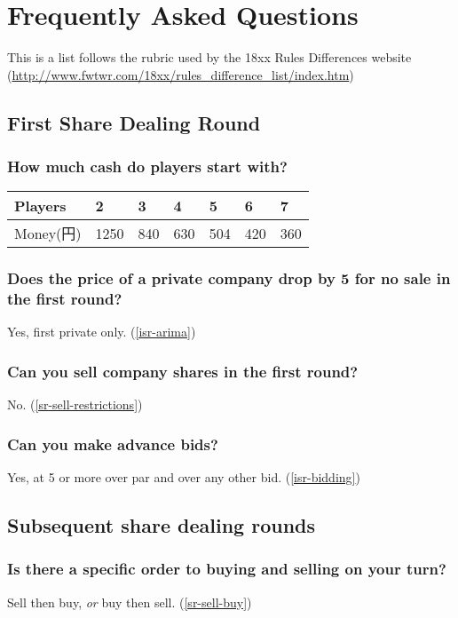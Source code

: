 \section{Frequently Asked Questions}
This is a list follows the rubric used by the 18xx Rules Differences
website
(\url{http://www.fwtwr.com/18xx/rules_difference_list/index.htm})

\renewcommand*{\thesubsection}{\arabic{subsection}}

\subsection{First Share Dealing Round}

\subsubsection{How much cash do players start with?}
\begin{tabular}{l|llllll}
Players & 2 & 3 & 4 & 5 & 6 & 7 \\ \hline
Money(円) & 1250 & 840 & 630 & 504 & 420 & 360
\end{tabular}

\subsubsection{Does the price of a private company drop by 5 for no
  sale in the first round?}
Yes, first private only. (\autoref{isr-arima})

\subsubsection{Can you sell company shares in the first round?}
No. (\autoref{sr-sell-restrictions})

\subsubsection{Can you make advance bids?}
Yes, at 5 or more over par and over any other bid. (\autoref{isr-bidding})

\subsection{Subsequent share dealing rounds}

\subsubsection{Is there a specific order to buying and selling on your turn?}
Sell then buy, \emph{or} buy then sell. (\autoref{sr-sell-buy})

